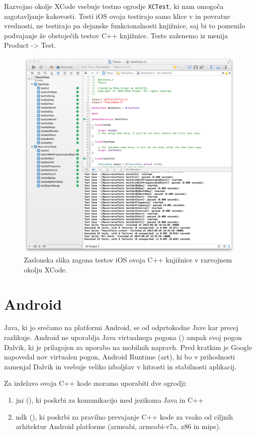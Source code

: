 Razvojno okolje XCode vsebuje testno ogrodje \texttt{XCTest}, ki nam omogoča zagotavljanje kakovosti. Testi iOS ovoja testirajo samo klice v in povratne vrednosti, ne testirajo pa dejanske funkcionalnosti knjižnice, saj bi to pomenilo podvajanje že obstoječih testov C++ knjižnice. Teste zaženemo iz menija Product -> Test.

\begin{figure}
 \includegraphics[width=\linewidth]{xcode-tests}
 \caption{Zaslonska slika zagona testov iOS ovoja C++ knjižnice v razvojnem okolju XCode.}
 \label{fig:xcode-tests}
\end{figure}

\section{Android}

Java, ki jo srečamo na platformi Android, se od odprtokodne Jave kar precej razlikuje. Android ne uporablja Java virtualnega pogona () ampak svoj pogon Dalvik, ki je prilagojen za uporabo na mobilnih napravh. Pred kratkim je Google napovedal nov virtualen pogon, Android Runtime (\gls{art}), ki bo v prihodnosti zamenjal Dalvik in vsebuje veliko izboljšav v hitrosti in stabilnosti aplikacij.

Za izdelavo ovoja C++ kode moramo uporabiti dve ogrodji:

\begin{enumerate}
  \item \gls{jni} (), ki poskrbi za komunikacijo med jezikoma Java in C++
  \item \gls{ndk} (), ki poskrbi za pravilno prevajanje C++ kode za vsako od ciljnih arhitektur Android platforme (armeabi, armeabi-v7a, x86 in mips).
\end{enumerate}

